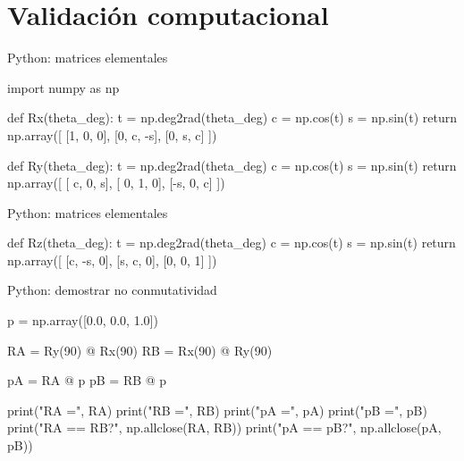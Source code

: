\documentclass[aspectratio=169,10pt]{beamer}
\begin{document}
\section{Validación computacional}

\begin{frame}[fragile]{Python: matrices elementales}
    \small
\begin{pythoncode}
import numpy as np

def Rx(theta_deg):
    t = np.deg2rad(theta_deg)
    c = np.cos(t)
    s = np.sin(t)
    return np.array([
        [1, 0, 0],
        [0, c, -s],
        [0, s,  c] ])

def Ry(theta_deg):
    t = np.deg2rad(theta_deg)
    c = np.cos(t)
    s = np.sin(t)
    return np.array([
        [ c, 0, s],
        [ 0, 1, 0],
        [-s, 0, c] ])
\end{pythoncode}
\end{frame}

\begin{frame}[fragile]{Python: matrices elementales}
    \small
    \begin{pythoncode}

def Rz(theta_deg):
    t = np.deg2rad(theta_deg)
    c = np.cos(t)
    s = np.sin(t)
    return np.array([
        [c, -s, 0],
        [s,  c, 0],
        [0,  0, 1]
    ])
\end{pythoncode}
\end{frame}

\begin{frame}[fragile]{Python: demostrar no conmutatividad}
    \small
\begin{pythoncode}
p = np.array([0.0, 0.0, 1.0])

RA = Ry(90) @ Rx(90)
RB = Rx(90) @ Ry(90)

pA = RA @ p
pB = RB @ p

print("RA =\n", RA)
print("RB =\n", RB)
print("pA =", pA)
print("pB =", pB)
print("RA == RB?", np.allclose(RA, RB))
print("pA == pB?", np.allclose(pA, pB))
\end{pythoncode}

\end{frame}
\end{document}
